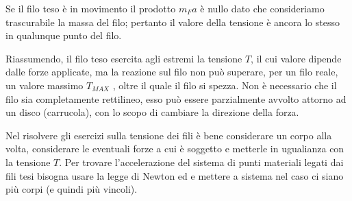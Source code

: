 \documentclass[class=book, crop=false, oneside, 12pt]{standalone}
\begin{document}
Se il filo teso è in movimento il prodotto \(m_F a\) è nullo dato che consideriamo trascurabile la massa del filo; pertanto il valore della tensione è ancora lo stesso in qualunque punto del filo.

Riassumendo, il filo teso esercita agli estremi la tensione \(T\), il cui valore dipende dalle forze applicate, ma la reazione sul filo non può superare, per un filo reale, un valore massimo \(T_{MAX}\) , oltre il quale il filo si spezza.\newline
Non è necessario che il filo sia completamente rettilineo, esso può essere parzialmente avvolto attorno ad un disco (carrucola), con lo scopo di cambiare la direzione della forza. 

Nel risolvere gli esercizi sulla tensione dei fili è bene considerare un corpo alla volta, considerare le eventuali forze a cui è soggetto e metterle in ugualianza con la tensione \(T\).
Per trovare l'accelerazione del sistema di punti materiali legati dai fili tesi bisogna usare la legge di Newton ed e mettere a sistema nel caso ci siano più corpi (e quindi più vincoli).
\end{document}
